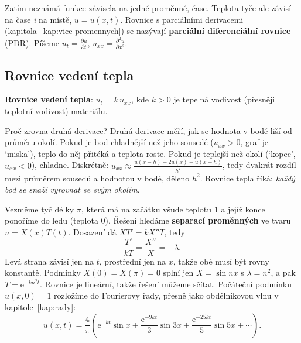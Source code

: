 Zatím neznámá funkce závisela na jedné proměnné, čase. Teplota tyče ale závisí na čase \textit{i} na místě, $u = u(x, t)$. Rovnice s parciálními derivacemi (kapitola~\ref{kap:vice-promennych}) se nazývají \textbf{parciální diferenciální rovnice} (PDR). Píšeme $u_t = \frac{\partial u}{\partial t}$, $u_{xx} = \frac{\partial^2u}{\partial x^2}$.

\subsection{Rovnice vedení tepla}

\begin{definitionbox}
  \textbf{Rovnice vedení tepla}: $u_t = k\,u_{xx}$, kde $k > 0$ je tepelná vodivost (přesněji teplotní vodivost) materiálu.
\end{definitionbox}

Proč zrovna druhá derivace? Druhá derivace měří, jak se hodnota v bodě liší od průměru okolí. Pokud je bod chladnější než jeho sousedé ($u_{xx} > 0$, graf je `miska'), teplo do něj přitéká a teplota roste. Pokud je teplejší než okolí (`kopec', $u_{xx} < 0$), chladne. Diskrétně: $u_{xx}\approx\frac{u(x - h) - 2u(x) + u(x + h)}{h^2}$, tedy dvakrát rozdíl mezi průměrem sousedů a hodnotou v bodě, děleno $h^2$. Rovnice tepla říká: \textit{každý bod se snaží vyrovnat se svým okolím}.

Vezměme tyč délky $\pi$, která má na začátku všude teplotu $1$ a jejíž konce ponoříme do ledu (teplota $0$). Řešení hledáme \textbf{separací proměnných} ve tvaru $u = X(x)T(t)$. Dosazení dá $XT' = kX''T$, tedy
\begin{equation*}
  \frac{T'}{kT} = \frac{X''}{X} = -\lambda.
\end{equation*}
Levá strana závisí jen na $t$, prostřední jen na $x$, takže obě musí být rovny konstantě. Podmínky $X(0) = X(\pi) = 0$ splní jen $X = \sin nx$ s $\lambda = n^2$, a pak $T = \mathrm{e}^{-kn^2t}$. Rovnice je lineární, takže řešení můžeme sčítat. Počáteční podmínku $u(x, 0) = 1$ rozložíme do Fourierovy řady, přesně jako obdélníkovou vlnu v kapitole~\ref{kap:rady}:
\begin{equation*}
  u(x, t) = \frac{4}{\pi}\left(\mathrm{e}^{-kt}\sin x + \frac{\mathrm{e}^{-9kt}}{3}\sin 3x + \frac{\mathrm{e}^{-25kt}}{5}\sin 5x + \cdots\right).
\end{equation*}

